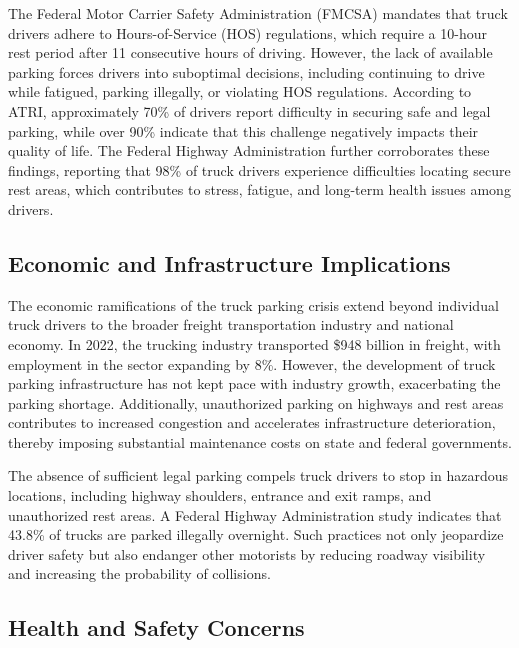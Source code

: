 \documentclass[
  12pt]{article}
\begin{document}
The Federal Motor Carrier Safety Administration (FMCSA) mandates that
truck drivers adhere to Hours-of-Service (HOS) regulations, which
require a 10-hour rest period after 11 consecutive hours of driving.
However, the lack of available parking forces drivers into suboptimal
decisions, including continuing to drive while fatigued, parking
illegally, or violating HOS regulations. According to ATRI,
approximately 70\% of drivers report difficulty in securing safe and
legal parking, while over 90\% indicate that this challenge negatively
impacts their quality of life. The Federal Highway Administration
further corroborates these findings, reporting that 98\% of truck
drivers experience difficulties locating secure rest areas, which
contributes to stress, fatigue, and long-term health issues among
drivers.

\hypertarget{economic-and-infrastructure-implications}{%
\subsection{Economic and Infrastructure
Implications}\label{economic-and-infrastructure-implications}}

The economic ramifications of the truck parking crisis extend beyond
individual truck drivers to the broader freight transportation industry
and national economy. In 2022, the trucking industry transported \$948
billion in freight, with employment in the sector expanding by 8\%.
However, the development of truck parking infrastructure has not kept
pace with industry growth, exacerbating the parking shortage.
Additionally, unauthorized parking on highways and rest areas
contributes to increased congestion and accelerates infrastructure
deterioration, thereby imposing substantial maintenance costs on state
and federal governments.

The absence of sufficient legal parking compels truck drivers to stop in
hazardous locations, including highway shoulders, entrance and exit
ramps, and unauthorized rest areas. A Federal Highway Administration
study indicates that 43.8\% of trucks are parked illegally overnight.
Such practices not only jeopardize driver safety but also endanger other
motorists by reducing roadway visibility and increasing the probability
of collisions.

\hypertarget{health-and-safety-concerns}{%
\subsection{Health and Safety
Concerns}\label{health-and-safety-concerns}}
\end{document}
